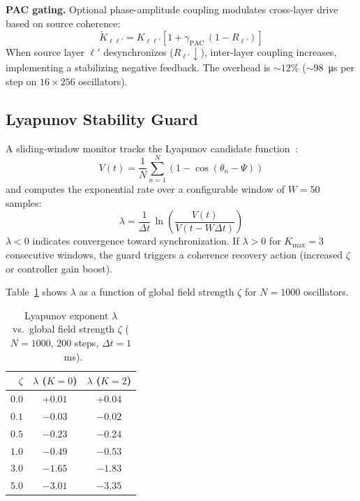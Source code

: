 \documentclass[twocolumn,preprintnumbers,amsmath,amssymb,prl,floatfix]{revtex4-2}
\begin{document}
\textbf{PAC gating.}\quad
Optional phase-amplitude coupling modulates cross-layer
drive based on source coherence:
%
\begin{equation}
  \tilde{K}_{\ell\ell'} = K_{\ell\ell'}
  \left[1 + \gamma_\mathrm{PAC}\,(1 - R_{\ell'})\right]
\end{equation}
%
When source layer $\ell'$ desynchronizes ($R_{\ell'} \downarrow$),
inter-layer coupling increases, implementing a stabilizing
negative feedback.  The overhead is ${\sim}12\%$ (${\sim}98$~\si{\micro\second}
per step on $16 \times 256$ oscillators).

\subsection{Lyapunov Stability Guard}
\label{sec:lyapunov}

A sliding-window monitor tracks the Lyapunov candidate
function~\cite{acebron2005}:
%
\begin{equation}
  V(t) = \frac{1}{N}\sum_{n=1}^{N}
  \left(1 - \cos(\theta_n - \Psi)\right)
\end{equation}
%
and computes the exponential rate over a configurable window
of $W = 50$ samples:
%
\begin{equation}
  \lambda = \frac{1}{\Delta t}\,
  \ln\!\left(\frac{V(t)}{V(t - W\Delta t)}\right)
  \label{eq:lambda}
\end{equation}
%
$\lambda < 0$ indicates convergence toward synchronization.
If $\lambda > 0$ for $K_\mathrm{max} = 3$ consecutive windows,
the guard triggers a coherence recovery action (increased $\zeta$
or controller gain boost).

Table~\ref{tab:lyapunov} shows $\lambda$ as a function of global
field strength $\zeta$ for $N = 1000$ oscillators.

\begin{table}[tb]
\centering
\caption{Lyapunov exponent $\lambda$ vs.\ global field strength
$\zeta$ ($N = 1000$, 200 steps, $\Delta t = 1$~ms).}
\label{tab:lyapunov}
\begin{tabular}{rcc}
\toprule
$\zeta$ & $\lambda$ ($K=0$) & $\lambda$ ($K=2$) \\
\midrule
$0.0$ & $+0.01$ & $+0.04$ \\
$0.1$ & $-0.03$ & $-0.02$ \\
$0.5$ & $-0.23$ & $-0.24$ \\
$1.0$ & $-0.49$ & $-0.53$ \\
$3.0$ & $-1.65$ & $-1.83$ \\
$5.0$ & $-3.01$ & $-3.35$ \\
\bottomrule
\end{tabular}
\end{table}
\end{document}
